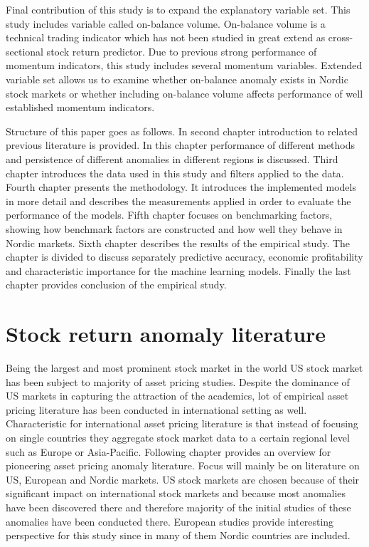 \documentclass[12pt]{article}
\begin{document}
Final contribution of this study is to expand the explanatory variable set. This study includes variable called on-balance volume. On-balance volume is a technical trading indicator which has not been studied in great extend as cross-sectional stock return predictor. Due to previous strong performance of momentum indicators, this study includes several momentum variables. Extended variable set allows us to examine whether on-balance anomaly exists in Nordic stock markets or whether including on-balance volume affects performance of well established momentum indicators. \par

Structure of this paper goes as follows. In second chapter introduction to related previous literature is provided. In this chapter performance of different methods and persistence of different anomalies in different regions is discussed. Third chapter introduces the data used in this study and filters applied to the data. Fourth chapter presents the methodology. It introduces the implemented models in more detail and describes the measurements applied in order to evaluate the performance of the models. Fifth chapter focuses on benchmarking factors, showing how benchmark factors are constructed and how well they behave in Nordic markets. Sixth chapter describes the results of the empirical study. The chapter is divided to discuss separately predictive accuracy, economic profitability and characteristic importance for the machine learning models. Finally the last chapter provides conclusion of the empirical study. \par

\section{Stock return anomaly literature}\label{StockReturnAnomalyLiterature}

Being the largest and most prominent stock market in the world US stock market has been subject to majority of asset pricing studies. Despite the dominance of US markets in capturing the attraction of the academics, lot of empirical asset pricing literature has been conducted in international setting as well. Characteristic for international asset pricing literature is that instead of focusing on single countries they aggregate stock market data to a certain regional level such as Europe or Asia-Pacific. Following chapter provides an overview for pioneering asset pricing anomaly literature. Focus will mainly be on literature on US, European and Nordic markets. US stock markets are chosen because of their significant impact on international stock markets and because most anomalies have been discovered there and therefore majority of the initial studies of these anomalies have been conducted there. European studies provide interesting perspective for this study since in many of them Nordic countries are included. \par
\end{document}
